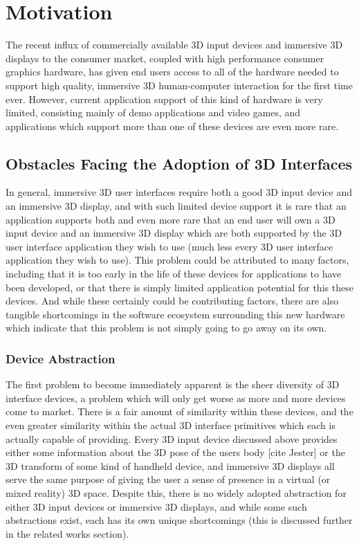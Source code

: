 \chapter{Motivation}
The recent influx of commercially available 3D input devices and immersive 3D displays to the consumer market, coupled with high performance consumer graphics hardware, has given end users access to all of the hardware needed to support high quality, immersive 3D human-computer interaction for the first time ever. However, current application support of this kind of hardware is very limited, consisting mainly of demo applications and video games, and applications which support more than one of these devices are even more rare. 

\section{Obstacles Facing the Adoption of 3D Interfaces}

In general, immersive 3D user interfaces require both a good 3D input device and an immersive 3D display, and with such limited device support it is rare that an application supports both and even more rare that an end user will own a 3D input device and an immersive 3D display which are both supported by the 3D user interface application they wish to use (much less every 3D user interface application they wish to use). This problem could be attributed to many factors, including that it is too early in the life of these devices for applications to have been developed, or that there is simply limited application potential for this these devices. And while these certainly could be contributing factors, there are also tangible shortcomings in the software ecosystem surrounding this new hardware which indicate that this problem is not simply going to go away on its own.

\subsection{Device Abstraction}

The first problem to become immediately apparent is the sheer diversity of 3D interface devices, a problem which will only get worse as more and more devices come to market. There is a fair amount of similarity within these devices, and the even greater similarity within the actual 3D interface primitives which each is actually capable of providing. Every 3D input device discussed above provides either some information about the 3D pose of the users body [cite Jester] or the 3D transform of some kind of handheld device, and immersive 3D displays all serve the same purpose of giving the user a sense of presence in a virtual (or mixed reality) 3D space. Despite this, there is no widely adopted abstraction for either 3D input devices or immersive 3D displays, and while some such abstractions exist, each has its own unique shortcomings (this is discussed further in the related works section).

